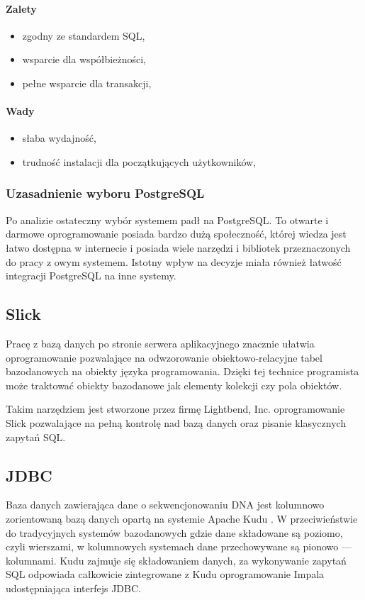 \documentclass[a4paper,12pt,twoside]{article}
\begin{document}
\paragraph{Zalety}
\begin{itemize}
\item{zgodny ze standardem SQL},
\item{wsparcie dla współbieżności},
\item{pełne wsparcie dla transakcji},
\end{itemize}
\paragraph{Wady}
\begin{itemize}
\item{słaba wydajność},
\item{trudność instalacji dla początkujących użytkowników},
\end{itemize}

\subsubsection{Uzasadnienie wyboru PostgreSQL}
Po analizie ostateczny wybór systemem padł na PostgreSQL.
To otwarte i darmowe oprogramowanie posiada bardzo dużą społeczność, której wiedza jest łatwo dostępna w internecie
i posiada wiele narzędzi i bibliotek przeznaczonych do pracy z owym systemem.
Istotny wpływ na decyzje miała również łatwość integracji PostgreSQL na inne systemy.

\subsection{Slick}
Pracę z bazą danych po stronie serwera aplikacyjnego
znacznie ułatwia oprogramowanie pozwalające na odwzorowanie obiektowo-relacyjne tabel bazodanowych na obiekty języka programowania.
Dzięki tej technice programista może traktować obiekty bazodanowe jak elementy kolekcji czy pola obiektów.

Takim narzędziem jest stworzone przez firmę Lightbend, Inc.
oprogramowanie Slick\cite{slick} pozwalające na pełną kontrolę nad bazą danych oraz pisanie klasycznych zapytań SQL.

\subsection{JDBC}
Baza danych zawierająca dane o sekwencjonowaniu DNA jest kolumnowo zorientowaną bazą danych opartą na systemie Apache Kudu \cite{kudu}. W przeciwieństwie do tradycyjnych systemów bazodanowych gdzie dane składowane są poziomo, czyli wierszami, w kolumnowych systemach dane przechowywane są pionowo — kolumnami.
Kudu zajmuje się składowaniem danych, za wykonywanie zapytań SQL
odpowiada całkowicie zintegrowane z Kudu oprogramowanie Impala \cite{impala} \cite{impalaArt} udostępniająca interfejs JDBC.
\end{document}
